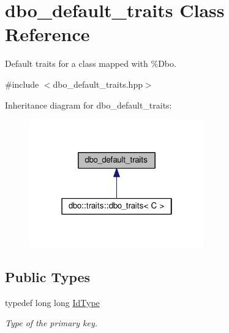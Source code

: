 \hypertarget{structdbo__default__traits}{\section{dbo\+\_\+default\+\_\+traits Class Reference}
\label{structdbo__default__traits}
}


Default traits for a class mapped with \%Dbo.  




{\ttfamily \#include $<$dbo\+\_\+default\+\_\+traits.\+hpp$>$}



Inheritance diagram for dbo\+\_\+default\+\_\+traits\+:\nopagebreak
\begin{figure}[H]
\begin{center}
\leavevmode
\includegraphics[width=214pt]{structdbo__default__traits__inherit__graph}
\end{center}
\end{figure}
\subsection*{Public Types}
\begin{DoxyCompactItemize}
\item 
typedef long long \hyperlink{structdbo__default__traits_a01f10d78fdf6ae4a23dff88daa60b8ac}{Id\+Type}
\begin{DoxyCompactList}\small\item\em Type of the primary key. \end{DoxyCompactList}\end{DoxyCompactItemize}
